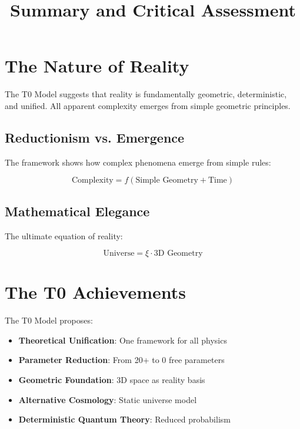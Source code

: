 \documentclass[12pt,a4paper]{report}
\begin{document}
	\section{The Nature of Reality}
	
	\begin{insight}
		The T0 Model suggests that reality is fundamentally geometric, deterministic, and unified. All apparent complexity emerges from simple geometric principles.
	\end{insight}
	
	\subsection{Reductionism vs. Emergence}
	
	The framework shows how complex phenomena emerge from simple rules:
	
	\begin{equation}
		\text{Complexity} = f(\text{Simple Geometry} + \text{Time})
	\end{equation}
	
	\subsection{Mathematical Elegance}
	
	The ultimate equation of reality:
	
	\begin{equation}
		\boxed{\text{Universe} = \xi \cdot \text{3D Geometry}}
	\end{equation}
	
	\title{Summary and Critical Assessment}
\maketitle
	
	\section{The T0 Achievements}
	
	The T0 Model proposes:
	
	\begin{itemize}
		\item \textbf{Theoretical Unification}: One framework for all physics
		\item \textbf{Parameter Reduction}: From 20+ to 0 free parameters
		\item \textbf{Geometric Foundation}: 3D space as reality basis
		\item \textbf{Alternative Cosmology}: Static universe model
		\item \textbf{Deterministic Quantum Theory}: Reduced probabilism
	\end{itemize}
	
\end{document}
